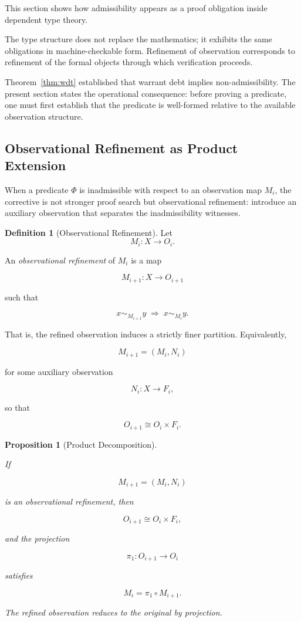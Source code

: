 \documentclass[12pt]{article}
\theoremstyle{plain}
\newtheorem{proposition}[theorem]{Proposition}
\theoremstyle{definition}
\newtheorem{definition}[theorem]{Definition}
\theoremstyle{remark}
\begin{document}
This section shows how admissibility appears as a proof obligation
inside dependent type theory.

The type structure does not replace the mathematics; it exhibits the
same obligations in machine-checkable form.
Refinement of observation corresponds to refinement of the formal
objects through which verification proceeds.

Theorem~\ref{thm:wdt} established that warrant debt implies
non-admissibility.
The present section states the operational consequence: before proving
a predicate, one must first establish that the predicate is
well-formed relative to the available observation structure.

\subsection{Observational Refinement as Product Extension}

When a predicate $\Phi$ is inadmissible with respect to an observation
map $M_i$, the corrective is not stronger proof search but
observational refinement: introduce an auxiliary observation that
separates the inadmissibility witnesses.

\begin{definition}[Observational Refinement]

Let
\[
M_i : X \to O_i.
\]

An \emph{observational refinement} of $M_i$ is a map

\[
M_{i+1} : X \to O_{i+1}
\]

such that

\[
x \sim_{M_{i+1}} y
\;\Rightarrow\;
x \sim_{M_i} y.
\]

That is, the refined observation induces a strictly finer partition.
Equivalently,

\[
M_{i+1} = (M_i, N_i)
\]

for some auxiliary observation

\[
N_i : X \to F_i,
\]

so that

\[
O_{i+1} \cong O_i \times F_i.
\]

\end{definition}

\begin{proposition}[Product Decomposition]
\label{prop:product}

If

\[
M_{i+1} = (M_i, N_i)
\]

is an observational refinement, then

\[
O_{i+1} \cong O_i \times F_i,
\]

and the projection

\[
\pi_1 : O_{i+1} \to O_i
\]

satisfies

\[
M_i = \pi_1 \circ M_{i+1}.
\]

The refined observation reduces to the original by projection.

\end{proposition}
\end{document}
